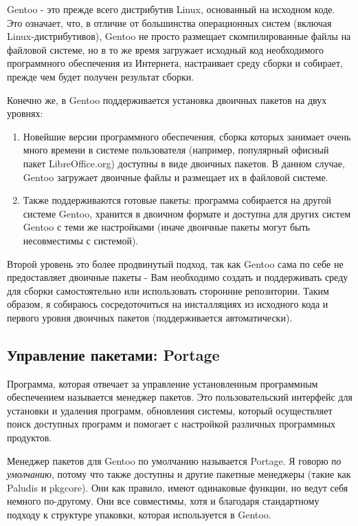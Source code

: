 \documentclass[10pt]{book}
\begin{document}
Gentoo - это прежде всего дистрибутив Linux, основанный на исходном коде. Это означает, что, в отличие от большинства операционных систем (включая Linux-дистрибутивов), Gentoo не просто размещает  скомпилированные файлы на файловой системе, но в то же время загружает исходный код необходимого программного обеспечения из Интернета, настраивает среду сборки и собирает, прежде чем будет получен результат сборки.

Конечно же, в Gentoo поддерживается установка двоичных пакетов на двух уровнях:
\begin{enumerate} 
\item Новейшие версии программного обеспечения, сборка которых занимает очень много времени в системе пользователя (например, популярный офисный пакет LibreOffice.org) доступны в виде двоичных пакетов. В данном случае, Gentoo загружает двоичные файлы и размещает их в файловой системе.
\item Также поддерживаются готовые пакеты: программа собирается на другой системе Gentoo, хранится в двоичном формате и доступна для других систем Gentoo с теми же настройками (иначе двоичные пакеты могут быть несовместимы с системой).
\end{enumerate}

Второй уровень это более продвинутый подход, так  как Gentoo сама по себе не предоставляет двоичные пакеты - Вам необходимо создать и поддерживать среду для сборки самостоятельно или использовать сторонние репозитории. Таким образом, я собираюсь сосредоточиться на инсталляциях из исходного кода и первого уровня двоичных пакетов (поддерживается автоматически).

\subsection{Управление пакетами: Portage}

Программа, которая отвечает за управление установленным программным обеспечением называется менеджер пакетов. Это пользовательский интерфейс для установки и удаления программ, обновления системы, который осуществляет поиск доступных программ и помогает с настройкой различных программных продуктов.

Менеджер пакетов для Gentoo по умолчанию называется Portage. Я говорю \textit{по умолчанию}, потому что также доступны и другие пакетные менеджеры (такие как Paludis и pkgcore). Они как правило, имеют одинаковые функции, но ведут себя немного по-другому. Они все совместимы, хотя и благодаря стандартному подходу к структуре упаковки, которая используется в Gentoo.
\end{document}
